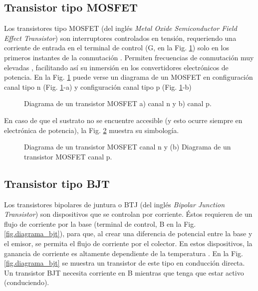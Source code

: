 \documentclass{report}
\begin{document}
\subsection{Transistor tipo MOSFET} \label{sec.mosfet}
Los transistores tipo MOSFET (del inglés \textit{Metal Oxide Semiconductor Field Effect Transistor}) son interruptores controlados en tensión, requeriendo una corriente de entrada en el terminal de control (G, en la Fig. \ref{fig.diagrama_mosfets}) solo en los primeros instantes de la conmutación \cite{dieciocho}. Permiten frecuencias de conmutación muy elevadas \cite{treinta}, facilitando así su inmersión en los convertidores electrónicos de potencia. En la Fig. \ref{fig.diagrama_mosfets} \cite{uno} puede verse un diagrama de un MOSFET en configuración canal tipo n (Fig. \ref{fig.diagrama_mosfets}-a) y configuración canal tipo p (Fig. \ref{fig.diagrama_mosfets}-b)
\begin{figure}[!h]
    \begin{center}
    \end{center}
    \caption{Diagrama de un transistor MOSFET a) canal n y b) canal p. \cite{uno}}
    \label{fig.diagrama_mosfets}
    \end{figure}

En caso de que el sustrato no se encuentre accesible (y esto ocurre siempre en electrónica de potencia), la Fig. \ref{fig.diagrama_mosfets_enriquecimiento_empobrecimiento} muestra su simbología.

\begin{figure}[!h]
    \begin{center}
    \end{center}
    \caption{Diagrama de un transistor MOSFET canal n y (b) Diagrama de un transistor MOSFET canal p. \cite{uno}}
    \label{fig.diagrama_mosfets_enriquecimiento_empobrecimiento}
    \end{figure}

\subsection{Transistor tipo BJT} \label{sec.bjt}
Los transistores bipolares de juntura o BTJ (del inglés \textit{Bipolar Junction Transistor}) son dispositivos que se controlan por corriente. Éstos requieren de un flujo de corriente por la base (terminal de control, B en la Fig. \ref{fig.diagrama_bjt}), para que, al crear una diferencia de potencial entre la base y el emisor, se permita el flujo de corriente por el colector. En estos dispositivos, la ganancia de corriente es altamente dependiente de la temperatura \cite{diecinueve}. En la Fig. \ref{fig.diagrama_bjt} \cite{veintiuno} se muestra un transistor de este tipo en conducción directa. Un transistor BJT necesita corriente en B mientras que tenga que estar activo (conduciendo).
\end{document}
